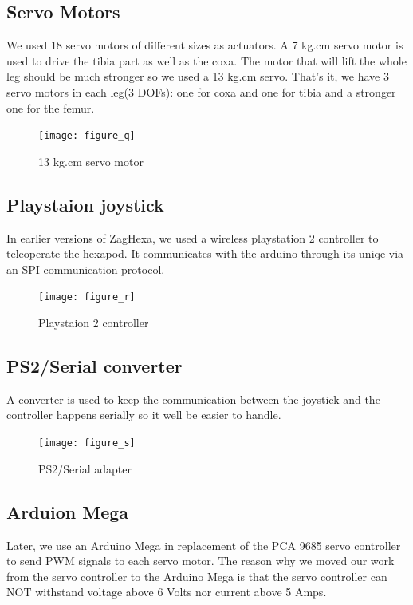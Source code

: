 \subsection{Servo Motors}
We used 18 servo motors of different sizes as actuators. A 7 kg.cm servo motor is used to drive the tibia part as well as the coxa. The motor that will lift the whole leg should be much stronger so we used a 13 kg.cm servo. That's it, we have 3 servo motors in each leg(3 DOFs): one for coxa and one for tibia and a stronger one for the femur.

\begin{figure}[H]
	\centering
	\texttt{[image: figure\_q]}
	\caption{13 kg.cm servo motor}
	\label{figure_q}
\end{figure}

\subsection{Playstaion joystick}
In earlier versions of ZagHexa, we used a wireless playstation 2 controller to teleoperate the hexapod. It communicates with the arduino through its uniqe via an SPI communication protocol.

\begin{figure}[H]
	\centering
	\texttt{[image: figure\_r]}
	\caption{Playstaion 2 controller}
	\label{figure_r}
\end{figure}

\subsection{PS2/Serial converter}
A converter is used to keep the communication between the joystick and the controller happens serially so it well be easier to handle.

\begin{figure}[H]
	\centering
	\texttt{[image: figure\_s]}
	\caption{PS2/Serial adapter}
	\label{figure_s}
\end{figure}

\subsection{Arduion Mega}
Later, we use an Arduino Mega in replacement of the PCA 9685 servo controller to send PWM signals to each servo motor. The reason why we moved our work from the servo controller to the Arduino Mega is that the servo controller can NOT withstand voltage above 6 Volts nor current above 5 Amps.

